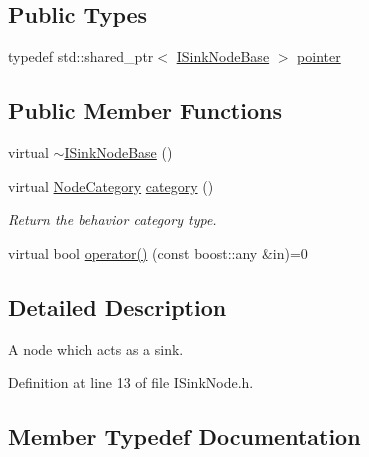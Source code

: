 \subsection*{Public Types}
\begin{DoxyCompactItemize}
\item 
typedef std\+::shared\+\_\+ptr$<$ \hyperlink{class_wire_cell_1_1_i_sink_node_base}{I\+Sink\+Node\+Base} $>$ \hyperlink{class_wire_cell_1_1_i_sink_node_base_a24a5f7170b121dd9ce5a0ea31ef9614d}{pointer}
\end{DoxyCompactItemize}
\subsection*{Public Member Functions}
\begin{DoxyCompactItemize}
\item 
virtual \hyperlink{class_wire_cell_1_1_i_sink_node_base_a39a4ff13ba5364518da0e3be75234266}{$\sim$\+I\+Sink\+Node\+Base} ()
\item 
virtual \hyperlink{class_wire_cell_1_1_i_node_a5546e64cbb70bd3ac787295cac9ac803}{Node\+Category} \hyperlink{class_wire_cell_1_1_i_sink_node_base_aed8e3945184e47177abf0b16c74e6aff}{category} ()
\begin{DoxyCompactList}\small\item\em Return the behavior category type. \end{DoxyCompactList}\item 
virtual bool \hyperlink{class_wire_cell_1_1_i_sink_node_base_a449038481c2f511bcfa7c7bf77641069}{operator()} (const boost\+::any \&in)=0
\end{DoxyCompactItemize}


\subsection{Detailed Description}
A node which acts as a sink. 

Definition at line 13 of file I\+Sink\+Node.\+h.



\subsection{Member Typedef Documentation}
\mbox{\label{class_wire_cell_1_1_i_sink_node_base_a24a5f7170b121dd9ce5a0ea31ef9614d}} 
